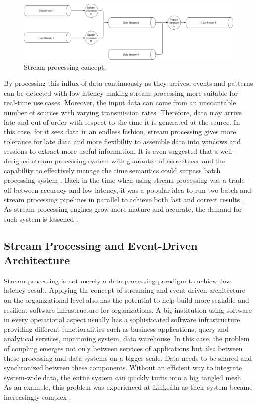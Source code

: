 \begin{figure}[h]
	\includegraphics[width=\linewidth]{images/streamprocessing.png}
	\caption{Stream processing concept.}
	\label{fig:streamprocessing}
\end{figure}


By processing this influx of data continuously as they arrives, events and patterns can be detected with low latency making stream processing more suitable for real-time use cases. Moreover, the input data can come from an uncountable number of sources with varying transmission rates. Therefore, data may arrive late and out of order with respect to the time it is generated at the source. In this case, for it sees data in an endless fashion, stream processing gives more tolerance for late data and more flexibility to assemble data into windows and sessions to extract more useful information. It is even suggested that a well-designed stream processing system with guarantee of correctness and the capability to effectively manage the time semantics could surpass batch processing system \cite{stream101}. Back in the time when using stream processing was a trade-off between accuracy and low-latency, it was a popular idea to run two batch and stream processing pipelines in parallel to achieve both fast and correct results \cite{lambdaarchitecture}.  As stream processing engines grow more mature and accurate, the demand for such system is lessened \cite{questionlambdaarchitecture}.
\subsection{Stream Processing and Event-Driven Architecture}

Stream processing is not merely a data processing paradigm to achieve low latency result. Applying the concept of streaming and event-driven architecture on the organizational level also has the potential to help build more scalable and resilient software infrastructure for organizations. A big institution using software in every operational aspect usually has a sophisticated software infrastructure providing different functionalities such as business applications, query and analytical services, monitoring system, data warehouse. In this case, the problem of coupling emerges not only between services of applications but also between these processing and data systems on a bigger scale. Data needs to be shared and synchronized between these components. Without an efficient way to integrate system-wide data, the entire system can quickly turns into a big tangled mesh. As an example, this problem was experienced at LinkedIn as their system became increasingly complex \cite{eventstreamingplatform}. 

